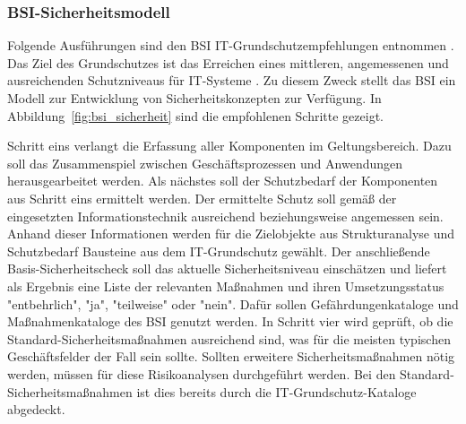 \documentclass[11pt,a4paper]{report}
\begin{document}
\subsubsection{BSI-Sicherheitsmodell}

Folgende Ausführungen sind den BSI IT-Grundschutzempfehlungen entnommen \cite{bsi_grundsch1,bsi_grundsch2,bsi_grundsch3,bsi_grundsch4}.
Das Ziel des Grundschutzes ist das Erreichen eines mittleren, angemessenen und ausreichenden Schutzniveaus für IT-Systeme \cite{wiki_itgrundschutz}. Zu diesem Zweck stellt das BSI ein Modell zur Entwicklung von Sicherheitskonzepten zur Verfügung. In Abbildung~\ref{fig:bsi_sicherheit} sind die empfohlenen Schritte gezeigt. 

Schritt eins verlangt die Erfassung aller Komponenten im Geltungsbereich. Dazu soll das Zusammenspiel zwischen Geschäftsprozessen und Anwendungen herausgearbeitet werden. Als nächstes soll der Schutzbedarf der Komponenten aus Schritt eins ermittelt werden. Der ermittelte Schutz soll gemäß der eingesetzten Informationstechnik ausreichend beziehungsweise angemessen sein. Anhand dieser Informationen werden für die Zielobjekte aus Strukturanalyse und Schutzbedarf Bausteine aus dem IT-Grundschutz gewählt. Der anschließende Basis-Sicherheitscheck soll das aktuelle Sicherheitsniveau einschätzen und liefert als Ergebnis eine Liste der relevanten Maßnahmen und ihren Umsetzungsstatus "entbehrlich", "ja", "teilweise" oder "nein". Dafür sollen Gefährdungenkataloge und Maßnahmenkataloge des BSI genutzt werden. In Schritt vier wird geprüft, ob die Standard-Sicherheitsmaßnahmen ausreichend sind, was für die meisten typischen Geschäftsfelder der Fall sein sollte. Sollten erweitere Sicherheitsmaßnahmen nötig werden, müssen für diese Risikoanalysen durchgeführt werden. Bei den Standard-Sicherheitsmaßnahmen ist dies bereits durch die IT-Grundschutz-Kataloge abgedeckt. 
\end{document}
